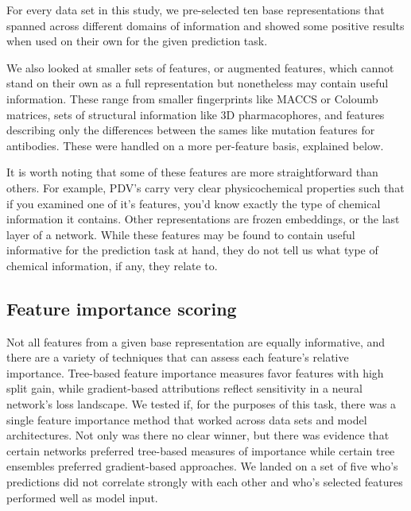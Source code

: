 {For every data set in this study, we pre-selected ten base representations that spanned across different domains of information and showed some positive results when used on their own for the given prediction task. 

We also looked at smaller sets of features, or augmented features, which cannot stand on their own as a full representation but nonetheless may contain useful information. These range from smaller fingerprints like MACCS or Coloumb matrices, sets of structural information like 3D pharmacophores, and features describing only the differences between the sames like mutation features for antibodies. These were handled on a more per-feature basis, explained below. 

It is worth noting that some of these features are more straightforward than others. For example, PDV's carry very clear physicochemical properties such that if you examined one of it's features, you'd know exactly the type of chemical information it contains. Other representations are frozen embeddings, or the last layer of a network. While these features may be found to contain useful informative for the prediction task at hand, they do not tell us what type of chemical information, if any, they relate to. 



\subsection{Feature importance scoring}


Not all features from a given base representation are equally informative, and there are a variety of techniques that can assess each feature's relative importance. Tree-based feature importance measures favor features with high split gain, while gradient-based attributions reflect sensitivity in a neural network's loss landscape. \cite{??} 
We tested if, for the purposes of this task, there was a single feature importance method that worked across data sets and model architectures. Not only was there no clear winner, but there was evidence that certain networks preferred tree-based measures of importance while certain tree ensembles preferred gradient-based approaches. We landed on a set of five who's predictions did not correlate strongly with each other and who's selected features performed well as model input.

}
